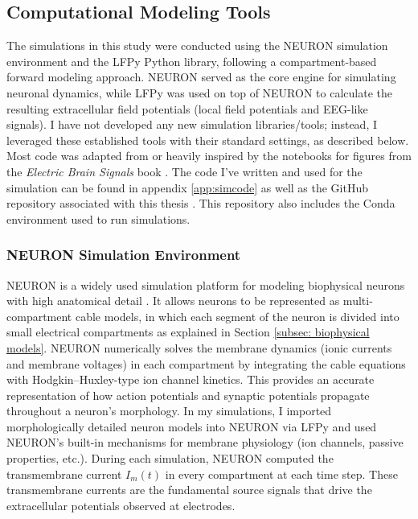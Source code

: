 \documentclass[final, a4paper,masters,en,listoffigures,listoftables,norwegiandates]{NMBU}
\begin{document}
\subsection{Computational Modeling Tools}

The simulations in this study were conducted using the NEURON simulation environment and the LFPy Python library, following a compartment-based forward modeling approach. NEURON served as the core engine for simulating neuronal dynamics, while LFPy was used on top of NEURON to calculate the resulting extracellular field potentials (local field potentials and EEG-like signals). I have not developed any new simulation libraries/tools; instead, I leveraged these established tools with their standard settings, as described below. Most code was adapted from or heavily inspired by the notebooks for figures from the \textit{Electric Brain Signals} book \cite{Halnes2024ElectricBrainSignals}. The code I've written and used for the simulation can be found in appendix \ref{app:simcode} as well as the GitHub repository associated with this thesis \cite{repo}. This repository also includes the Conda environment used to run simulations.

\subsubsection{NEURON Simulation Environment}
NEURON is a widely used simulation platform for modeling biophysical neurons with high anatomical detail \cite{Hines1997}. It allows neurons to be represented as multi-compartment cable models, in which each segment of the neuron is divided into small electrical compartments as explained in Section \ref{subsec: biophysical models}. NEURON numerically solves the membrane dynamics (ionic currents and membrane voltages) in each compartment by integrating the cable equations with Hodgkin--Huxley-type ion channel kinetics. This provides an accurate representation of how action potentials and synaptic potentials propagate throughout a neuron’s morphology. In my simulations, I imported morphologically detailed neuron models into NEURON via LFPy and used NEURON’s built-in mechanisms for membrane physiology (ion channels, passive properties, etc.). During each simulation, NEURON computed the transmembrane current $I_m(t)$ in every compartment at each time step. These transmembrane currents are the fundamental source signals that drive the extracellular potentials observed at electrodes.
\end{document}
